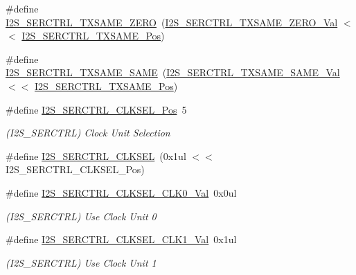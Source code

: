 \begin{DoxyCompactItemize}
\#define \mbox{\hyperlink{group___s_a_m_d21___i2_s_ga671df1a746649f2cf5fd860315931de3}{I2\+S\+\_\+\+S\+E\+R\+C\+T\+R\+L\+\_\+\+T\+X\+S\+A\+M\+E\+\_\+\+Z\+E\+RO}}~(\mbox{\hyperlink{group___s_a_m_d21___i2_s_ga4d9741f2fdd8ab91dcff51dc82289531}{I2\+S\+\_\+\+S\+E\+R\+C\+T\+R\+L\+\_\+\+T\+X\+S\+A\+M\+E\+\_\+\+Z\+E\+R\+O\+\_\+\+Val}}   $<$$<$ \mbox{\hyperlink{group___s_a_m_d21___i2_s_ga9b168cb1f01139e629ae9b74b162e89d}{I2\+S\+\_\+\+S\+E\+R\+C\+T\+R\+L\+\_\+\+T\+X\+S\+A\+M\+E\+\_\+\+Pos}})
\item 
\#define \mbox{\hyperlink{group___s_a_m_d21___i2_s_ga1cf789e8c8462392452f685aaead532b}{I2\+S\+\_\+\+S\+E\+R\+C\+T\+R\+L\+\_\+\+T\+X\+S\+A\+M\+E\+\_\+\+S\+A\+ME}}~(\mbox{\hyperlink{group___s_a_m_d21___i2_s_ga92284b3ada619a52545be416f07d72bf}{I2\+S\+\_\+\+S\+E\+R\+C\+T\+R\+L\+\_\+\+T\+X\+S\+A\+M\+E\+\_\+\+S\+A\+M\+E\+\_\+\+Val}}   $<$$<$ \mbox{\hyperlink{group___s_a_m_d21___i2_s_ga9b168cb1f01139e629ae9b74b162e89d}{I2\+S\+\_\+\+S\+E\+R\+C\+T\+R\+L\+\_\+\+T\+X\+S\+A\+M\+E\+\_\+\+Pos}})
\item 
\#define \mbox{\hyperlink{group___s_a_m_d21___i2_s_ga635d10c7415f6983a88bb44028a9189d}{I2\+S\+\_\+\+S\+E\+R\+C\+T\+R\+L\+\_\+\+C\+L\+K\+S\+E\+L\+\_\+\+Pos}}~5
\begin{DoxyCompactList}\small\item\em (I2\+S\+\_\+\+S\+E\+R\+C\+T\+RL) Clock Unit Selection \end{DoxyCompactList}\item 
\#define \mbox{\hyperlink{group___s_a_m_d21___i2_s_ga28aedee7d0f4a4a7cb4620f0edd6fa32}{I2\+S\+\_\+\+S\+E\+R\+C\+T\+R\+L\+\_\+\+C\+L\+K\+S\+EL}}~(0x1ul $<$$<$ I2\+S\+\_\+\+S\+E\+R\+C\+T\+R\+L\+\_\+\+C\+L\+K\+S\+E\+L\+\_\+\+Pos)
\item 
\#define \mbox{\hyperlink{group___s_a_m_d21___i2_s_gab48fb4788e3411fa66e9b1455308ddb4}{I2\+S\+\_\+\+S\+E\+R\+C\+T\+R\+L\+\_\+\+C\+L\+K\+S\+E\+L\+\_\+\+C\+L\+K0\+\_\+\+Val}}~0x0ul
\begin{DoxyCompactList}\small\item\em (I2\+S\+\_\+\+S\+E\+R\+C\+T\+RL) Use Clock Unit 0 \end{DoxyCompactList}\item 
\#define \mbox{\hyperlink{group___s_a_m_d21___i2_s_gab9167eed536cc029b8ec93fd000286b4}{I2\+S\+\_\+\+S\+E\+R\+C\+T\+R\+L\+\_\+\+C\+L\+K\+S\+E\+L\+\_\+\+C\+L\+K1\+\_\+\+Val}}~0x1ul
\begin{DoxyCompactList}\small\item\em (I2\+S\+\_\+\+S\+E\+R\+C\+T\+RL) Use Clock Unit 1 \end{DoxyCompactList}\item 
$$
\end{DoxyCompactItemize}
